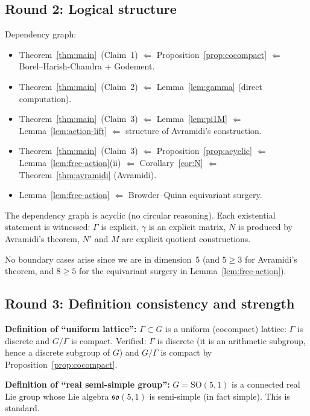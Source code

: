 \documentclass[12pt]{article}
\theoremstyle{definition}
\theoremstyle{remark}
\begin{document}
\subsection*{Round 2: Logical structure}

Dependency graph:
\begin{itemize}
  \item Theorem~\ref{thm:main}~(Claim~1) $\Leftarrow$ Proposition~\ref{prop:cocompact}
        $\Leftarrow$ Borel--Harish-Chandra + Godement.
  \item Theorem~\ref{thm:main}~(Claim~2) $\Leftarrow$ Lemma~\ref{lem:gamma} (direct computation).
  \item Theorem~\ref{thm:main}~(Claim~3) $\Leftarrow$ Lemma~\ref{lem:pi1M} $\Leftarrow$
        Lemma~\ref{lem:action-lift} $\Leftarrow$ structure of Avramidi's construction.
  \item Theorem~\ref{thm:main}~(Claim~3) $\Leftarrow$ Proposition~\ref{prop:acyclic}
        $\Leftarrow$ Lemma~\ref{lem:free-action}(ii) $\Leftarrow$ Corollary~\ref{cor:N}
        $\Leftarrow$ Theorem~\ref{thm:avramidi} (Avramidi).
  \item Lemma~\ref{lem:free-action} $\Leftarrow$ Browder--Quinn equivariant surgery.
\end{itemize}
The dependency graph is acyclic (no circular reasoning). Each existential statement
is witnessed: $\Gamma$ is explicit, $\gamma$ is an explicit matrix, $N$ is produced by
Avramidi's theorem, $N'$ and $M$ are explicit quotient constructions.

No boundary cases arise since we are in dimension~5 (and $5 \geq 3$ for Avramidi's theorem,
and $8 \geq 5$ for the equivariant surgery in Lemma~\ref{lem:free-action}).

\subsection*{Round 3: Definition consistency and strength}

\noindent\textbf{Definition of ``uniform lattice'':} $\Gamma \subset G$ is a uniform
(cocompact) lattice: $\Gamma$ is discrete and $G/\Gamma$ is compact. Verified:
$\Gamma$ is discrete (it is an arithmetic subgroup, hence a discrete subgroup of $G$)
and $G/\Gamma$ is compact by Proposition~\ref{prop:cocompact}.

\noindent\textbf{Definition of ``real semi-simple group'':} $G = \mathrm{SO}(5,1)$
is a connected real Lie group whose Lie algebra $\mathfrak{so}(5,1)$ is semi-simple
(in fact simple). This is standard.
\end{document}
